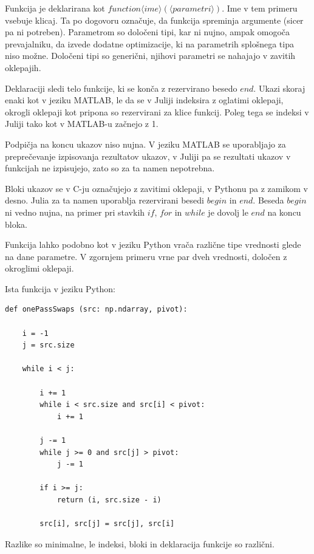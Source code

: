 \documentclass[journal,a4paper,twoside]{sty/IEEEtran}
\begin{document}
Funkcija je deklarirana kot $function \langle ime\rangle (\langle parametri\rangle )$.
Ime v tem primeru vsebuje klicaj.
Ta po dogovoru označuje, da funkcija spreminja argumente (sicer pa ni potreben).
Parametrom so določeni tipi, kar ni nujno, ampak omogoča prevajalniku, da izvede dodatne optimizacije, ki na parametrih splošnega tipa niso možne.
Določeni tipi so generični, njihovi parametri se nahajajo v zavitih oklepajih.

Deklaraciji sledi telo funkcije, ki se konča z rezervirano besedo $end$.
Ukazi skoraj enaki kot v jeziku MATLAB, le da se v Juliji indeksira z oglatimi oklepaji, okrogli oklepaji kot pripona so rezervirani za klice funkcij.
Poleg tega se indeksi v Juliji tako kot v MATLAB-u začnejo z 1.

Podpičja na koncu ukazov niso nujna.
V jeziku MATLAB se uporabljajo za preprečevanje izpisovanja rezultatov ukazov, v Juliji pa se rezultati ukazov v funkcijah ne izpisujejo, zato so
	za ta namen nepotrebna.

Bloki ukazov se v C-ju označujejo z zavitimi oklepaji, v Pythonu pa z zamikom v desno.
Julia za ta namen uporablja rezervirani besedi $begin$ in $end$.
Beseda $begin$ ni vedno nujna, na primer pri stavkih $if$, $for$ in $while$ je dovolj le $end$ na koncu bloka.

Funkcija lahko podobno kot v jeziku Python vrača različne tipe vrednosti glede na dane parametre.
V zgornjem primeru vrne par dveh vrednosti, določen z okroglimi oklepaji.

Ista funkcija v jeziku Python:
\begin{lstlisting}
def onePassSwaps (src: np.ndarray, pivot):

    i = -1
    j = src.size

    while i < j:

        i += 1
        while i < src.size and src[i] < pivot:
            i += 1

        j -= 1
        while j >= 0 and src[j] > pivot:
            j -= 1

        if i >= j:
            return (i, src.size - i)

        src[i], src[j] = src[j], src[i]
\end{lstlisting}

Razlike so minimalne, le indeksi, bloki in deklaracija funkcije so različni.
\end{document}

